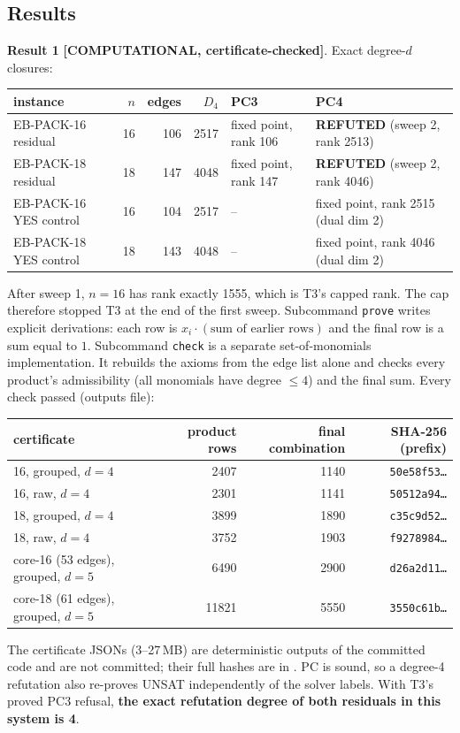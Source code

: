 \documentclass[11pt]{article}
\theoremstyle{remark}
\newcommand{\lab}[1]{\textbf{[#1]}}
\begin{document}
\subsection{Results}
\textbf{Result 1} \lab{COMPUTATIONAL, certificate-checked}. Exact degree-$d$ closures:
\begin{center}\begin{tabular}{lrrrll}
\toprule
instance & $n$ & edges & $D_4$ & PC3 & PC4\\
\midrule
EB-PACK-16 residual & 16 & 106 & 2517 & fixed point, rank 106 & \textbf{REFUTED} (sweep 2, rank 2513)\\
EB-PACK-18 residual & 18 & 147 & 4048 & fixed point, rank 147 & \textbf{REFUTED} (sweep 2, rank 4046)\\
EB-PACK-16 YES control & 16 & 104 & 2517 & -- & fixed point, rank 2515 (dual dim 2)\\
EB-PACK-18 YES control & 18 & 143 & 4048 & -- & fixed point, rank 4046 (dual dim 2)\\
\bottomrule
\end{tabular}\end{center}
After sweep 1, $n=16$ has rank exactly 1555, which is T3's capped rank. The cap therefore
stopped T3 at the end of the first sweep. Subcommand \texttt{prove} writes explicit derivations:
each row is $x_i\cdot(\text{sum of earlier rows})$ and the final row is a sum equal to $1$.
Subcommand \texttt{check} is a separate set-of-monomials implementation. It rebuilds the axioms
from the edge list alone and checks every product's admissibility (all monomials have degree
$\le4$) and the final sum. Every check passed (outputs file):
\begin{center}\begin{tabular}{lrrr}
\toprule
certificate & product rows & final combination & SHA-256 (prefix)\\
\midrule
16, grouped, $d=4$ & 2407 & 1140 & \texttt{50e58f53\ldots}\\
16, raw, $d=4$ & 2301 & 1141 & \texttt{50512a94\ldots}\\
18, grouped, $d=4$ & 3899 & 1890 & \texttt{c35c9d52\ldots}\\
18, raw, $d=4$ & 3752 & 1903 & \texttt{f9278984\ldots}\\
core-16 (53 edges), grouped, $d=5$ & 6490 & 2900 & \texttt{d26a2d11\ldots}\\
core-18 (61 edges), grouped, $d=5$ & 11821 & 5550 & \texttt{3550c61b\ldots}\\
\bottomrule
\end{tabular}\end{center}
The certificate JSONs (3--27\,MB) are deterministic outputs of the committed code and are not
committed; their full hashes are in . PC is sound, so a degree-4
refutation also re-proves UNSAT independently of the solver labels. With T3's proved PC3
refusal, \textbf{the exact refutation degree of both residuals in this system is 4}.
\end{document}
